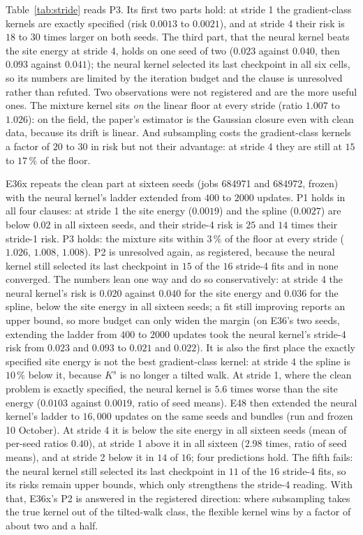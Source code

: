 \documentclass[10pt,a4paper]{article}
\theoremstyle{plain}
\theoremstyle{remark}
\begin{document}
Table~\ref{tab:stride} reads P3. Its first two parts hold: at stride 1 the gradient-class kernels are
exactly specified (risk $0.0013$ to $0.0021$), and at stride 4 their risk is $18$ to $30$ times larger on both
seeds. The third part, that the neural kernel beats the site energy at stride 4, holds on one seed of two
($0.023$ against $0.040$, then $0.093$ against $0.041$); the neural kernel selected its last checkpoint in all six
cells, so its numbers are limited by the iteration budget and the clause is unresolved rather than refuted.
Two observations were not registered and are the more useful ones. The mixture kernel sits \emph{on}
the linear floor at every stride (ratio $1.007$ to $1.026$): on the field, the paper's estimator is the Gaussian
closure even with clean data, because its drift is linear. And subsampling costs the gradient-class
kernels a factor of $20$ to $30$ in risk but not their advantage: at stride 4 they are still at $15$ to $17\,\%$ of the floor.

E36x repeats the clean part at sixteen seeds (jobs 684971 and 684972, frozen) with the neural kernel's ladder extended from $400$ to $2000$ updates. P1 holds in all four clauses: at stride 1 the site energy ($0.0019$) and the spline ($0.0027$) are below $0.02$ in all sixteen seeds, and their stride-4 risk is $25$ and $14$ times their stride-1 risk. P3 holds: the mixture sits within $3\,\%$ of the floor at every stride ($1.026$, $1.008$, $1.008$). P2 is unresolved again, as registered, because the neural kernel still selected its last checkpoint in $15$ of the $16$ stride-4 fits and in none converged. The numbers lean one way and do so conservatively: at stride 4 the neural kernel's risk is $0.020$ against $0.040$ for the site energy and $0.036$ for the spline, below the site energy in all sixteen seeds; a fit still improving reports an upper bound, so more budget can only widen the margin (on E36's two seeds, extending the ladder from $400$ to $2000$ updates took the neural kernel's stride-4 risk from $0.023$ and $0.093$ to $0.021$ and $0.022$). It is also the first place the exactly specified site energy is not the best gradient-class kernel: at stride 4 the spline is $10\,\%$ below it, because $K^s$ is no longer a tilted walk. At stride 1, where the clean problem is exactly specified, the neural kernel is $5.6$ times worse than the site energy ($0.0103$ against $0.0019$, ratio of seed means). E48 then extended the neural kernel's ladder to $16{,}000$ updates on the same seeds and bundles (run and frozen 10 October). At stride 4 it is below the site energy in all sixteen seeds (mean of per-seed ratios $0.40$), at stride 1 above it in all sixteen ($2.98$ times, ratio of seed means), and at stride 2 below it in $14$ of $16$; four predictions hold. The fifth fails: the neural kernel still selected its last checkpoint in $11$ of the $16$ stride-4 fits, so its risks remain upper bounds, which only strengthens the stride-4 reading. With that, E36x's P2 is answered in the registered direction: where subsampling takes the true kernel out of the tilted-walk class, the flexible kernel wins by a factor of about two and a half.
\end{document}
